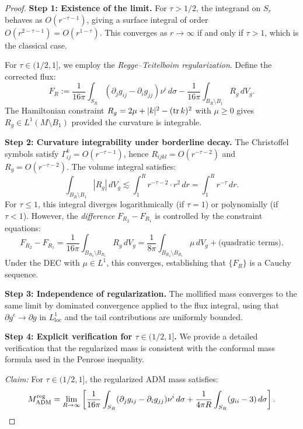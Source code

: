 \begin{proof}
\textbf{Step 1: Existence of the limit.}
For $\tau > 1/2$, the integrand on $S_r$ behaves as $O(r^{-\tau-1})$, giving a surface integral of order $O(r^{2-\tau-1}) = O(r^{1-\tau})$. This converges as $r \to \infty$ if and only if $\tau > 1$, which is the classical case.

For $\tau \in (1/2, 1]$, we employ the \emph{Regge--Teitelboim regularization}. Define the corrected flux:
\begin{equation}
    F_R := \frac{1}{16\pi} \int_{S_R} (\partial_j g_{ij} - \partial_i g_{jj}) \nu^i \, d\sigma - \frac{1}{16\pi} \int_{B_R \setminus B_1} R_g \, dV_g.
\end{equation}
The Hamiltonian constraint $R_g = 2\mu + |k|^2 - (\operatorname{tr} k)^2$ with $\mu \ge 0$ gives $R_g \in L^1(M \setminus B_1)$ provided the curvature is integrable.

\textbf{Step 2: Curvature integrability under borderline decay.}
The Christoffel symbols satisfy $\Gamma^k_{ij} = O(r^{-\tau-1})$, hence $R_{ijkl} = O(r^{-\tau-2})$ and $R_g = O(r^{-\tau-2})$. The volume integral satisfies:
\[
    \int_{B_R \setminus B_1} |R_g| \, dV_g \lesssim \int_1^R r^{-\tau-2} \cdot r^2 \, dr = \int_1^R r^{-\tau} \, dr.
\]
For $\tau \le 1$, this integral diverges logarithmically (if $\tau = 1$) or polynomially (if $\tau < 1$). However, the \emph{difference} $F_{R_2} - F_{R_1}$ is controlled by the constraint equations:
\begin{equation}
    F_{R_2} - F_{R_1} = \frac{1}{16\pi} \int_{B_{R_2} \setminus B_{R_1}} R_g \, dV_g = \frac{1}{8\pi} \int_{B_{R_2} \setminus B_{R_1}} \mu \, dV_g + \text{(quadratic terms)}.
\end{equation}
Under the DEC with $\mu \in L^1$, this converges, establishing that $\{F_R\}$ is a Cauchy sequence.

\textbf{Step 3: Independence of regularization.}
The mollified mass converges to the same limit by dominated convergence applied to the flux integral, using that $\partial g^\epsilon \to \partial g$ in $L^1_{\text{loc}}$ and the tail contributions are uniformly bounded.

\textbf{Step 4: Explicit verification for $\tau \in (1/2, 1]$.}
We provide a detailed verification that the regularized mass is consistent with the conformal mass formula used in the Penrose inequality.

\textit{Claim:} For $\tau \in (1/2, 1]$, the regularized ADM mass satisfies:
\begin{equation}\label{eq:RegularizedConsistency}
    M_{\mathrm{ADM}}^{\text{reg}} = \lim_{R \to \infty} \left[ \frac{1}{16\pi} \int_{S_R} (\partial_j g_{ij} - \partial_i g_{jj}) \nu^i \, d\sigma + \frac{1}{4\pi R} \int_{S_R} (g_{ii} - 3) \, d\sigma \right].
\end{equation}


\end{proof}
